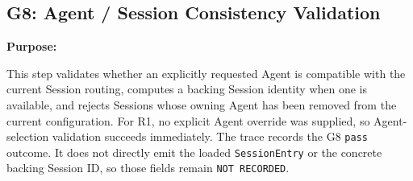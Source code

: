 \subsection*{G8: Agent / Session Consistency Validation}

\textbf{Purpose:}

This step validates whether an explicitly requested Agent is compatible
with the current Session routing, computes a backing Session identity
when one is available, and rejects Sessions whose owning Agent has been
removed from the current configuration. For R1, no explicit Agent
override was supplied, so Agent-selection validation succeeds
immediately. The trace records the G8 \texttt{pass} outcome. It does not
directly emit the loaded \texttt{SessionEntry} or the concrete backing
Session ID, so those fields remain \texttt{NOT RECORDED}.

